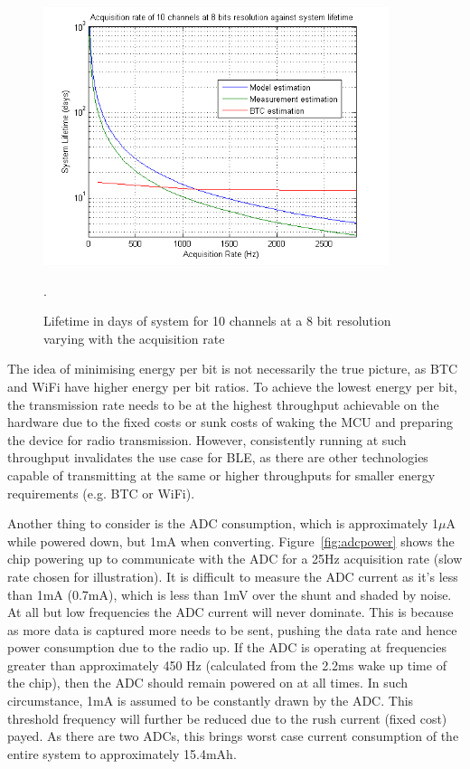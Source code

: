 \documentclass[]{article}
\begin{document}
\begin{figure}[H]
	\begin{center}
		\includegraphics[width = 0.9\textwidth]{lifetime}
	\end{center}
	\caption{Lifetime in days of system for 10 channels at a 8 bit resolution varying with the acquisition rate}. 
	\label{fig:lifetime}
\end{figure}


The idea of minimising energy per bit is not necessarily the true picture, as \ac{BTC} and WiFi have higher energy per bit ratios. To achieve the lowest energy per bit, the transmission rate needs to be at the highest throughput achievable on the hardware due to the fixed costs or sunk costs of waking the \ac{MCU} and preparing the device for radio transmission. However, consistently running at such throughput invalidates the use case for \ac{BLE}, as there are other technologies capable of transmitting at the same or higher throughputs for smaller energy requirements (e.g. \ac{BTC} or WiFi). 

Another thing to consider is the \ac{ADC} consumption, which is approximately 1$\mu$A while powered down, but 1mA when converting. Figure~\ref{fig:adcpower} shows the chip powering up to communicate with the \ac{ADC} for a 25Hz acquisition rate (slow rate chosen for illustration). It is difficult to measure the \ac{ADC} current as it's less than 1mA (0.7mA), which is less than 1mV over the shunt and shaded by noise. At all but low frequencies the \ac{ADC} current will never dominate. This is because as more data is captured more needs to be sent, pushing the data rate and hence power consumption due to the radio up. If the \ac{ADC} is operating at frequencies greater than approximately 450 Hz (calculated from the 2.2ms wake up time of the chip), then the \ac{ADC} should remain powered on at all times. In such circumstance, 1mA is assumed to be constantly drawn by the \ac{ADC}. This threshold frequency will further be reduced due to the rush current (fixed cost) payed. As there are two \ac{ADC}s, this brings worst case current consumption of the entire system to approximately 15.4mAh.
\end{document}
